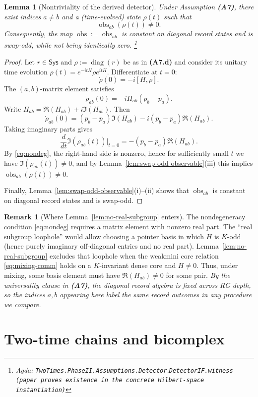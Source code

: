 \documentclass{article}
\newcommand{\Sys}{\mathsf{Sys}}
\newcommand{\diag}{\operatorname{diag}}
\newcommand{\obs}{\operatorname{obs}}
\newcommand{\Agda}[1]{\texttt{#1}}
\newcommand{\AgdaRef}[2]{\emph{Agda: }\Agda{#1}.\Agda{#2}}
\newcommand{\AgdaNote}[2]{\footnote{\AgdaRef{#1}{#2}}}
\theoremstyle{definition}
\newtheorem{remark}{Remark}[section]
\theoremstyle{plain}
\newtheorem{lemma}{Lemma}[section]
\begin{document}
\begin{lemma}[Nontriviality of the derived detector]
\label{lem:derived-detector-nontrivial}
Under Assumption \textbf{(A7)}, there exist indices $a\ne b$ and a (time-evolved)
state $\rho(t)$ such that
\[\obs_{ab}(\rho(t))\ne 0.\]
Consequently, the map $\obs:=\obs_{ab}$ is constant on diagonal record states and is
swap-odd, while not being identically zero.
\AgdaNote{TwoTimes.PhaseII.Assumptions.Detector}{DetectorIF.witness (paper proves existence in the concrete Hilbert-space instantiation)}
\end{lemma}

\begin{proof}
Let $r\in\Sys$ and $\rho:=\diag(r)$ be as in \textbf{(A7.d)} and consider its
unitary time evolution $\rho(t)=e^{-itH}\rho e^{itH}$.
Differentiate at $t=0$:
\[\dot\rho(0)=-i[H,\rho].\]
The $(a,b)$-matrix element satisfies
\[\dot\rho_{ab}(0)=-iH_{ab}(p_b-p_a).\]
Write $H_{ab}=\Re(H_{ab})+i\Im(H_{ab})$. Then
\[\dot\rho_{ab}(0)=(p_b-p_a)\Im(H_{ab}) - i(p_b-p_a)\Re(H_{ab}).\]
Taking imaginary parts gives
\[\frac{d}{dt}\Im(\rho_{ab}(t))\Big\rvert_{t=0}=-(p_b-p_a)\Re(H_{ab}).\]
By \eqref{eq:nondeg}, the right-hand side is nonzero, hence for sufficiently small
$t$ we have $\Im(\rho_{ab}(t))\ne 0$, and by Lemma~\ref{lem:swap-odd-observable}(iii)
this implies $\obs_{ab}(\rho(t))\ne 0$.

Finally, Lemma~\ref{lem:swap-odd-observable}(i)--(ii) shows that $\obs_{ab}$ is
constant on diagonal record states and is swap-odd.
\end{proof}

\begin{remark}[Where Lemma~\ref{lem:no-real-subgroup} enters]
The nondegeneracy condition \eqref{eq:nondeg} requires a matrix element with nonzero
real part. The ``real subgroup loophole'' would allow choosing a pointer basis in
which $H$ is $K$-odd (hence purely imaginary off-diagonal entries and no real part).
Lemma~\ref{lem:no-real-subgroup} excludes that loophole when the weakmini core
relation \eqref{eq:mixing-comm} holds on a $K$-invariant dense core and $H\ne 0$.
Thus, under mixing, some basis element must have $\Re(H_{ab})\ne 0$ for some pair.
\emph{By the universality clause in \textbf{(A7)}, the diagonal record algebra is fixed across RG depth, so the indices $a,b$ appearing here label the same record outcomes in any procedure we compare.}
\end{remark}

\section{Two-time chains and bicomplex}
\label{sec:bicomplex}
\end{document}
